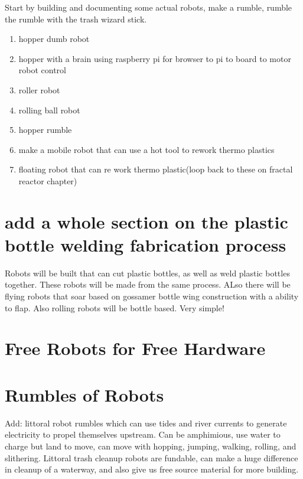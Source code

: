 Start by building and documenting some actual robots, make a rumble,
rumble the rumble with the trash wizard stick.

\begin{enumerate}
\def\labelenumi{\arabic{enumi}.}
\tightlist
\item
  hopper dumb robot
\item
  hopper with a brain using raspberry pi for browser to pi to board to
  motor robot control
\item
  roller robot
\item
  rolling ball robot
\item
  hopper rumble
\item
  make a mobile robot that can use a hot tool to rework thermo plastics
\item
  floating robot that can re work thermo plastic(loop back to these on
  fractal reactor chapter)
\end{enumerate}

\section{add a whole section on the plastic bottle welding fabrication
process}\label{add-a-whole-section-on-the-plastic-bottle-welding-fabrication-process}

Robots will be built that can cut plastic bottles, as well as weld
plastic bottles together. These robots will be made from the same
process. ALso there will be flying robots that soar based on gossamer
bottle wing construction with a ability to flap. Also rolling robots
will be bottle based. Very simple!

\section{Free Robots for Free
Hardware}\label{free-robots-for-free-hardware}

\section{Rumbles of Robots}\label{rumbles-of-robots}

Add: littoral robot rumbles which can use tides and river currents to
generate electricity to propel themselves upstream. Can be amphimious,
use water to charge but land to move, can move with hopping, jumping,
walking, rolling, and slithering. Littoral trash cleanup robots are
fundable, can make a huge difference in cleanup of a waterway, and also
give us free source material for more building.

